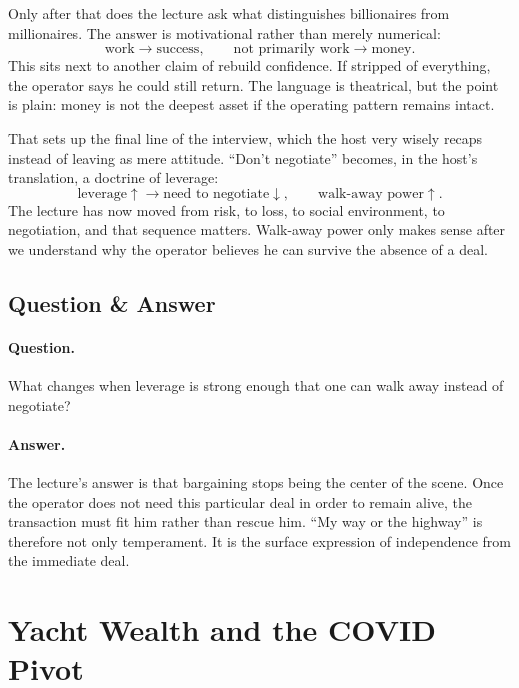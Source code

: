 Only after that does the lecture ask what distinguishes billionaires from millionaires. The answer is motivational rather than merely numerical:
\begin{equation}
\text{work} \to \text{success},
\qquad
\text{not primarily } \text{work} \to \text{money}.
\end{equation}
This sits next to another claim of rebuild confidence. If stripped of everything, the operator says he could still return. The language is theatrical, but the point is plain: money is not the deepest asset if the operating pattern remains intact.

That sets up the final line of the interview, which the host very wisely recaps instead of leaving as mere attitude. ``Don't negotiate'' becomes, in the host's translation, a doctrine of leverage:
\begin{equation}
\text{leverage}\uparrow \to \text{need to negotiate}\downarrow,
\qquad
\text{walk-away power}\uparrow.
\end{equation}
The lecture has now moved from risk, to loss, to social environment, to negotiation, and that sequence matters. Walk-away power only makes sense after we understand why the operator believes he can survive the absence of a deal.

\subsection{Question \& Answer}

\paragraph{Question.} What changes when leverage is strong enough that one can walk away instead of negotiate?

\paragraph{Answer.} The lecture's answer is that bargaining stops being the center of the scene. Once the operator does not need this particular deal in order to remain alive, the transaction must fit him rather than rescue him. ``My way or the highway'' is therefore not only temperament. It is the surface expression of independence from the immediate deal.

\section{Yacht Wealth and the COVID Pivot}

